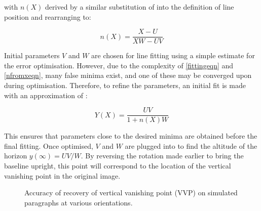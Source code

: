 {{\parindent 0mm
with $n(X)$ derived by a similar substitution of  into the definition of line position  and rearranging to:
}

\begin{equation}
n(X) = \frac{X-U}{XW-UV}
\label{nfromxeqn}
\end{equation}

Initial parameters $V$ and $W$ are chosen for line fitting using a simple estimate for the error optimisation.
However, due to the complexity of \ref{fittingeqn} and \ref{nfromxeqn}, many false minima exist, and one of these may be converged upon during optimisation.
Therefore, to refine the parameters, an initial fit is made with an approximation of :

\begin{equation}
Y(X) = \frac{ UV }{ 1+n(X)W }
\end{equation}

This ensures that parameters close to the desired minima are obtained before the final fitting.  Once optimised, $V$ and $W$ are plugged into  to find the altitude of the horizon $y(\infty) = UV/W$.
By reversing the rotation made earlier to bring the baseline upright, this point will correspond to the location of the vertical vanishing point in the original image.

\begin{figure}[t]
\begin{centering}
	\hspace{2mm}
\caption{Accuracy of recovery of vertical vanishing point (VVP) on simulated paragraphs at various orientations.}
\label{vvpaccuracy}
\end{centering}
\end{figure}

}
